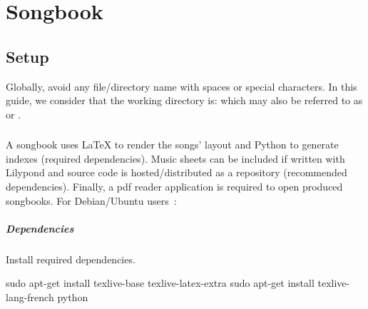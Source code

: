 \chapter{Songbook}
\setcounter{chapter}{1}
\label{chap:songbook}
\minitoc
{}


\section{Setup}
\label{sec:install}

Globally, avoid any file/directory name with spaces or special
characters. In this guide, we consider that the working directory is:
 which may also be referred to as
 or .

\subsection{\linux}

A songbook uses \LaTeX{} to render the songs' layout and Python to
generate indexes (required dependencies). Music sheets can be included
if written with Lilypond and source code is hosted/distributed as a
\git repository (recommended dependencies). Finally, a pdf reader
application is required to open produced songbooks. For Debian/Ubuntu
users~:

\paragraph{Dependencies}

Install required dependencies.
\begin{unix}
  sudo apt-get install texlive-base texlive-latex-extra
  sudo apt-get install texlive-lang-french python
\end{unix}

